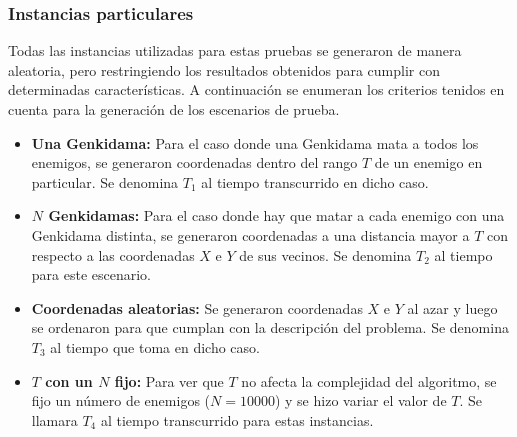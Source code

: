         \subsubsection{Instancias particulares}

            Todas las instancias utilizadas para estas pruebas se generaron de manera aleatoria, pero restringiendo los resultados obtenidos para cumplir con determinadas características. A continuación se enumeran los criterios tenidos en cuenta para la generación de los escenarios de prueba.

            \begin{itemize}
                \item \textbf{Una Genkidama:} Para el caso donde una
					Genkidama mata a todos los enemigos, se generaron
					coordenadas dentro del rango $T$ de un enemigo en
					particular. Se denomina $T_1$ al tiempo transcurrido en dicho caso.

                \item \textbf{$N$ Genkidamas:} Para el caso donde hay que matar
					a cada enemigo con una Genkidama distinta, se generaron coordenadas a
					una distancia mayor a $T$ con respecto a las coordenadas $X$ e
					$Y$ de sus vecinos. Se denomina $T_2$ al tiempo para este
					escenario.

				\item \textbf{Coordenadas aleatorias:} Se generaron coordenadas
				$X$ e $Y$ al azar y luego se ordenaron para que cumplan con la
			descripción del problema. Se denomina $T_3$ al tiempo que toma en dicho caso.

				\item \textbf{$T$ con un $N$ fijo:} Para ver que $T$ no	afecta
					la complejidad del algoritmo, se fijo un número de enemigos
					($N = 10000$) y se hizo variar el valor de $T$. Se llamara $T_4$
					al tiempo transcurrido para estas instancias.
            \end{itemize}



    \renewcommand\constante{11.5}

